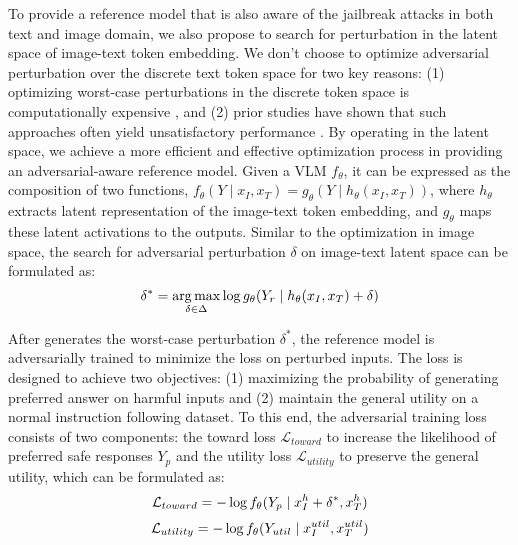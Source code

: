 To provide a reference model that is also aware of the jailbreak attacks in both text and image domain, we also propose to search for perturbation in the latent space of image-text token embedding. We don't choose to optimize adversarial perturbation over the discrete text token space for two key reasons: (1) optimizing worst-case perturbations in the discrete token space is computationally expensive \cite{harmbench}, and (2) prior studies have shown that such approaches often yield unsatisfactory performance \cite{CAT}.  By operating in the latent space, we achieve a more efficient and effective optimization process in providing an adversarial-aware reference model. Given a VLM $f_\theta$, it can be expressed as the composition of two functions, $f_\theta(Y \mid x_I, x_T) = g_\theta(Y \mid h_\theta(x_I,x_T))$, where $h_\theta$ extracts latent representation of the image-text token embedding, and $g_\theta$ maps these latent activations to the outputs. Similar to the optimization in image space, the search for adversarial perturbation $\delta$ on image-text latent space can be formulated as:
\vspace{-0.5em}
\begin{equation}
\fontsize{10}{12}
\label{equation 3}
    \delta^* = \argmax_{\delta \in \Delta} \log g_\theta(Y_{r} \mid h_{\theta}(x_I, x_T)+ \delta )
    \vspace{-0.5em}
\end{equation}


 After generates the worst-case perturbation $\delta^*$, the reference model is adversarially trained to minimize the loss on perturbed inputs. 
The loss is designed to achieve two objectives: (1) maximizing the probability of generating preferred answer on harmful inputs and (2) maintain the general utility on a normal instruction following dataset. To this end, the adversarial training loss consists of two components: the toward loss $\mathcal{L}_{toward}$ to increase the likelihood of preferred safe responses $Y_{p}$  and the utility loss $\mathcal{L}_{utility}$ to preserve the general utility, which can be formulated as: 
\vspace{-0.5em}
\begin{equation}
\fontsize{10}{12}
    \mathcal{L}_{toward} = -\log f_{\theta}(Y_{p}\mid x^{h}_I+\delta^*, x^{h}_T)
\end{equation}
\begin{equation}
\fontsize{10}{12}
    \mathcal{L}_{utility} = -\log f_{\theta}(Y_{util}\mid x^{util}_I, x^{util}_T)
\end{equation}
\vspace{-1em}

